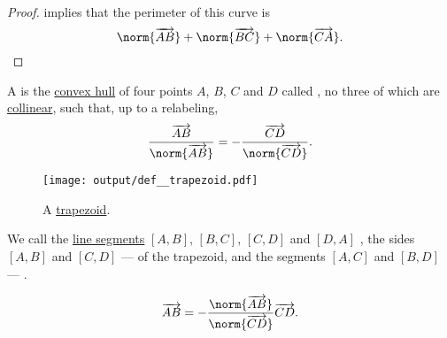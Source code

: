 \begin{proof}
   implies that the perimeter of this curve is
  \begin{equation*}
    \norm{\vect{AB}} + \norm{\vect{BC}} + \norm{\vect{CA}}.
  \end{equation*}
\end{proof}

\begin{definition}\label{def:trapezoid}\mimprovised
  A  is the \hyperref[def:convex_hull]{convex hull} of four points \( A \), \( B \), \( C \) and \( D \) called , no three of which are \hyperref[def:collinear_points]{collinear}, such that, up to a relabeling,
  \begin{equation*}
    \frac {\vect{AB}} {\norm{\vect{AB}}} = -\frac {\vect{CD}} {\norm{\vect{CD}}}.
  \end{equation*}

  \begin{figure}[!ht]
    \centering
    \texttt{[image: output/def\_\_trapezoid.pdf]}
    \caption{A \hyperref[def:trapezoid]{trapezoid}.}\label{fig:def:trapezoid}
  \end{figure}

  We call the \hyperref[def:line_segment]{line segments} \( [A, B] \), \( [B, C] \), \( [C, D] \) and \( [D, A] \) , the sides \( [A, B] \) and \( [C, D] \) ---  of the trapezoid, and the segments \( [A, C] \) and \( [B, D] \) --- .

  \begin{equation*}
    \vect{AB} = -\frac {\norm{\vect{AB}}} {\norm{\vect{CD}}} \vect{CD}.
  \end{equation*}
\end{definition}

